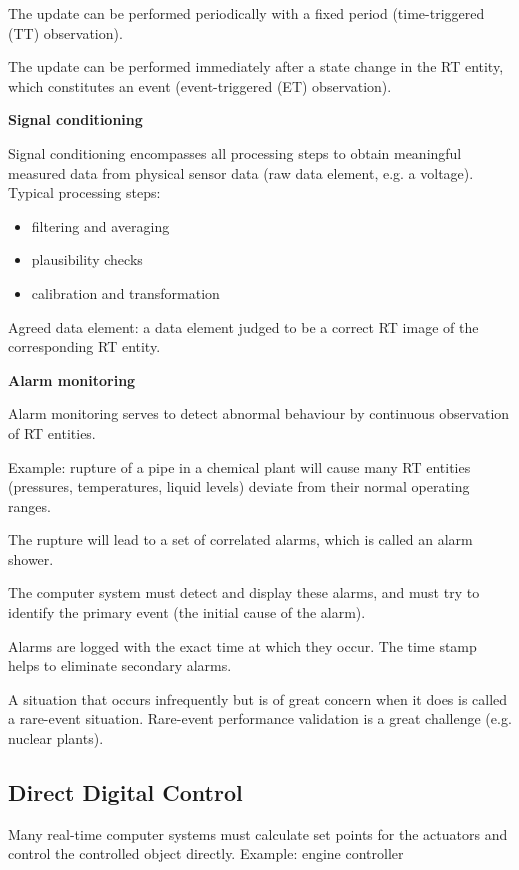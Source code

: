 The update can be performed periodically with a fixed period
(time-triggered (TT) observation).

The update can be performed immediately after a state change in the RT
entity, which constitutes an event (event-triggered (ET) observation).

\textbf{Signal conditioning}

Signal conditioning encompasses all processing steps to obtain
meaningful measured data from physical sensor data (raw data element,
e.g. a voltage). Typical processing steps:

\begin{itemize}
\item
  filtering and averaging
\item
  plausibility checks
\item
  calibration and transformation
\end{itemize}

Agreed data element: a data element judged to be a correct RT image of
the corresponding RT entity.

\textbf{Alarm monitoring}

Alarm monitoring serves to detect abnormal behaviour by continuous
observation of RT entities.

Example: rupture of a pipe in a chemical plant will cause many RT
entities (pressures, temperatures, liquid levels) deviate from their
normal operating ranges.

The rupture will lead to a set of correlated alarms, which is called an
alarm shower.

The computer system must detect and display these alarms, and must try
to identify the primary event (the initial cause of the alarm).

Alarms are logged with the exact time at which they occur. The time
stamp helps to eliminate secondary alarms.

A situation that occurs infrequently but is of great concern when it
does is called a rare-event situation. Rare-event performance validation
is a great challenge (e.g. nuclear plants).

\subsection{Direct Digital Control}\label{direct-digital-control}

Many real-time computer systems must calculate set points for the
actuators and control the controlled object directly. Example: engine
controller

